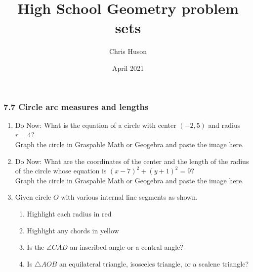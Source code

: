 \documentclass[12pt, twoside]{article}
\title{High School Geometry problem sets}
\author{Chris Huson}
\date{April 2021}
\begin{document}
\subsubsection*{7.7 Circle arc measures and lengths}
\begin{enumerate}
\item Do Now: What is the equation of a circle with center $(-2,5)$ and radius $r=4$?\\[0.5cm]
Graph the circle in Graspable Math or Geogebra and paste the image here.

\newpage
\item Do Now: What are the coordinates of the center and the length of the radius of the circle whose equation is $(x-7)^2+(y+1)^2=9$?\\[0.5cm]
Graph the circle in Graspable Math or Geogebra and paste the image here.

\newpage
\item Given circle $O$ with various internal line segments as shown.
    \begin{multicols}{2}
    \raggedcolumns
    \begin{enumerate}[itemsep=0.5cm]
      \item Highlight each radius in red
      \item Highlight any chords in yellow
      \item Is the $\angle CAD$ an inscribed angle or a central angle?
      \item Is $\triangle AOB$ an equilateral triangle, isosceles triangle, or a scalene triangle?
      
    \end{enumerate}
    \end{multicols}


\end{enumerate}
\end{document}
